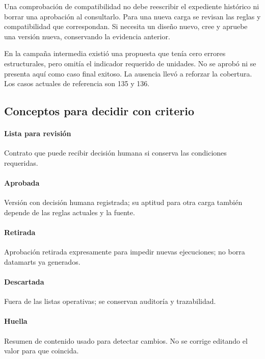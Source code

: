 Una comprobación de compatibilidad no debe reescribir el expediente histórico ni borrar una aprobación al consultarlo. Para una nueva carga se revisan las reglas y compatibilidad que correspondan. Si necesita un diseño nuevo, cree y apruebe una versión nueva, conservando la evidencia anterior.

En la campaña intermedia existió una propuesta que tenía cero errores estructurales, pero omitía el indicador requerido de unidades. No se aprobó ni se presenta aquí como caso final exitoso. La ausencia llevó a reforzar la cobertura. Los casos actuales de referencia son 135 y 136.

\subsection{Conceptos para decidir con criterio}
\paragraph{Lista para revisión} Contrato que puede recibir decisión humana si conserva las condiciones requeridas.

\paragraph{Aprobada} Versión con decisión humana registrada; su aptitud para otra carga también depende de las reglas actuales y la fuente.

\paragraph{Retirada} Aprobación retirada expresamente para impedir nuevas ejecuciones; no borra datamarts ya generados.

\paragraph{Descartada} Fuera de las listas operativas; se conservan auditoría y trazabilidad.

\paragraph{Huella} Resumen de contenido usado para detectar cambios. No se corrige editando el valor para que coincida.

